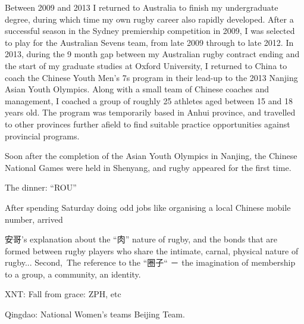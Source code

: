 Between 2009 and 2013 I returned to Australia to finish my undergraduate degree, during which time my own rugby career also rapidly developed. After a successful season in the Sydney premiership competition in 2009, I was selected to play for the Australian Sevens team, from late 2009 through to late 2012.  In 2013, during the 9 month gap between my Australian rugby contract ending and the start of my graduate studies at Oxford University, I returned to China to coach the Chinese Youth Men's 7s program in their lead-up to the 2013 Nanjing Asian Youth Olympics. Along with a small team of Chinese coaches and management, I coached a group of roughly 25 athletes aged between 15 and 18 years old.  The program was temporarily based in Anhui province, and travelled to other provinces further afield to find suitable practice opportunities against provincial programs.

Soon after the completion of the Asian Youth Olympics in Nanjing, the Chinese National Games were held in Shenyang, and rugby appeared for the first time.



The dinner:
``ROU''

After spending Saturday doing odd jobs like organising a local Chinese mobile number, arrived


安哥’s explanation about the “肉” nature of rugby, and the bonds that are formed between rugby players who share the intimate, carnal, physical nature of rugby... Second, The reference to the “圈子“ － the imagination of membership to a group, a community, an identity.




XNT:
Fall from grace: ZPH, etc

Qingdao:
National Women's teams
Beijing Team.
